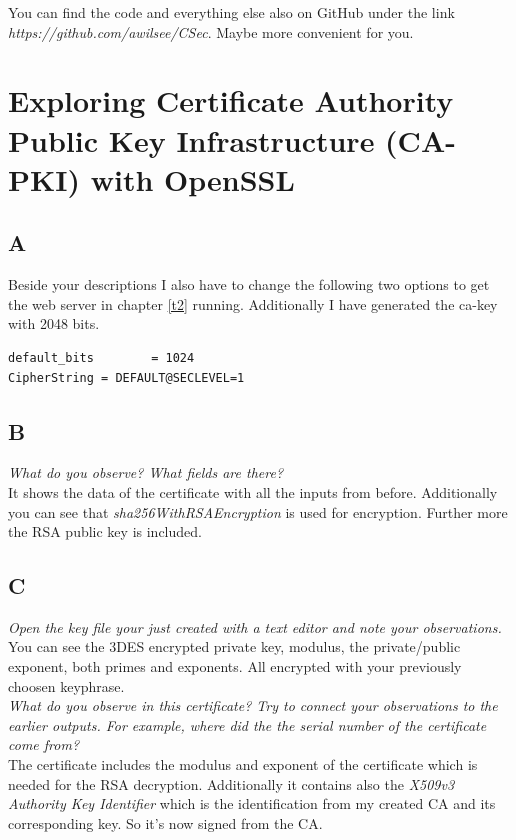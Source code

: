 You can find the code and everything else also on GitHub under the link \textit{https://github.com/awilsee/CSec}. Maybe more convenient for you.


\section{Exploring Certificate Authority Public Key Infrastructure (CA-PKI) with OpenSSL}

\subsection{A}

Beside your descriptions I also have to change the following two options to get the web server in chapter \ref{t2} running. Additionally I have generated the ca-key with 2048 bits.

\begin{lstlisting}
default_bits		= 1024
CipherString = DEFAULT@SECLEVEL=1
\end{lstlisting}

\subsection{B}

\textit{What do you observe? What fields are there?} \\
It shows the data of the certificate with all the inputs from before. Additionally you can see that \textit{sha256WithRSAEncryption} is used for encryption. Further more the RSA public key is included.\\

\subsection{C}

\textit{Open the key file your just created with a text editor and note your observations.} \\
You can see the 3DES encrypted private key, modulus, the private/public exponent, both primes and exponents. All encrypted with your previously choosen keyphrase.\\

\textit{What do you observe in this certificate? Try to connect your
observations to the earlier outputs. For example, where did the the serial number of the certificate come from?}\\
The certificate includes the modulus and exponent of the certificate which is needed for the RSA decryption. Additionally it contains also the \textit{X509v3 Authority Key Identifier} which is the identification from my created CA and its corresponding key. So it's now signed from the CA.\\


